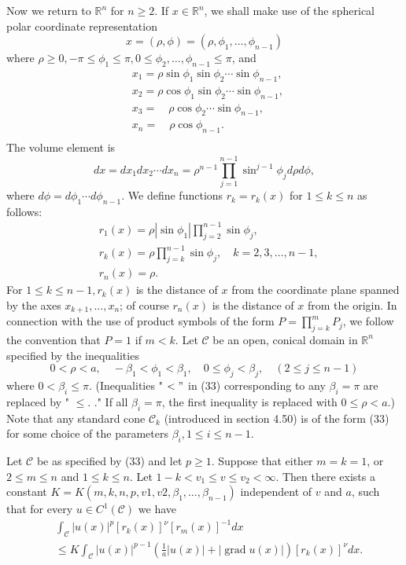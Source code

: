 \begin{para}
  Now we return to $\mathbb{R}^n$ for $n \geq 2$. If $x \in \mathbb{R}^n$, we shall make use of the spherical polar coordinate representation
  \[
  x=(\rho, \phi)=\left(\rho, \phi_1, \ldots, \phi_{n-1}\right)
  \]
  where $\rho \geq 0,-\pi \leq \phi_1 \leq \pi, 0 \leq \phi_2, \ldots, \phi_{n-1} \leq \pi$, and
  \[
  \begin{aligned}
  & x_1=\rho \sin \phi_1 \sin \phi_2 \cdots \sin \phi_{n-1}, \\
  & x_2=\rho \cos \phi_1 \sin \phi_2 \cdots \sin \phi_{n-1} \text {, } \\
  & x_3=\quad \rho \cos \phi_2 \cdots \sin \phi_{n-1} \text {, } \\
  & x_n=\quad \rho \cos \phi_{n-1} \text {. } \\
  &
  \end{aligned}
  \]
  The volume element is
  \[
  d x=d x_1 d x_2 \cdots d x_n=\rho^{n-1} \prod_{j=1}^{n-1} \sin ^{j-1} \phi_j d \rho d \phi,
  \]
  where $d \phi=d \phi_1 \cdots d \phi_{n-1}$.
  We define functions $r_k=r_k(x)$ for $1 \leq k \leq n$ as follows:
  \[
  \begin{aligned}
  & r_1(x)=\rho\left|\sin \phi_1\right| \prod_{j=2}^{n-1} \sin \phi_j, \\
  & r_k(x)=\rho \prod_{j=k}^{n-1} \sin \phi_j, \quad k=2,3, \ldots, n-1, \\
  & r_n(x)=\rho .
  \end{aligned}
  \]
  For $1 \leq k \leq n-1, r_k(x)$ is the distance of $x$ from the coordinate plane spanned by the axes $x_{k+1}, \ldots, x_n$; of course $r_n(x)$ is the distance of $x$ from the origin. In connection with the use of product symbols of the form $P=\prod_{j=k}^m P_j$, we follow the convention that $P=1$ if $m<k$.
  Let $\mathcal{C}$ be an open, conical domain in $\mathbb{R}^n$ specified by the inequalities
  \[
  0<\rho<a, \quad-\beta_1<\phi_1<\beta_1, \quad 0 \leq \phi_j<\beta_j, \quad(2 \leq j \leq n-1)
  \]
  where $0<\beta_i \leq \pi$. (Inequalities " $<"$ in (33) corresponding to any $\beta_i=\pi$ are replaced by " $\leq$. ." If all $\beta_i=\pi$, the first inequality is replaced with $0 \leq \rho<a$.) Note that any standard cone $\mathcal{C}_k$ (introduced in section 4.50) is of the form (33) for some choice of the parameters $\beta_i, 1 \leq i \leq n-1$.
\end{para}


\begin{lemma}
  Let $\mathcal{C}$ be as specified by (33) and let $p \geq 1$. Suppose that either $m=k=1$, or $2 \leq m \leq n$ and $1 \leq k \leq n$. Let $1-k<v_1 \leq v \leq v_2<\infty$. Then there exists a constant $K=K\left(m, k, n, p, v 1, v 2, \beta_1, \ldots, \beta_{n-1}\right)$ independent of $v$ and $a$, such that for every $u \in C^1(\mathcal{C})$ we have
  \[
  \begin{aligned}
  & \int_{\mathcal{C}}|u(x)|^p\left[r_k(x)\right]^\nu\left[r_m(x)\right]^{-1} d x \\
  & \leq K \int_{\mathcal{C}}|u(x)|^{p-1}\left(\frac{1}{a}|u(x)|+|\operatorname{grad} u(x)|\right)\left[r_k(x)\right]^\nu d x .
  \end{aligned}
  \]
\end{lemma}

